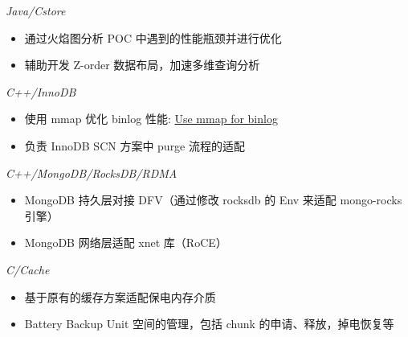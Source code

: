 \documentclass{resume}
\begin{document}
\textit{Java/Cstore}
\begin{onehalfspacing}
\begin{itemize}
  \item 通过火焰图分析 POC 中遇到的性能瓶颈并进行优化
  \item 辅助开发 Z-order 数据布局，加速多维查询分析
\end{itemize}
\end{onehalfspacing}

\textit{C++/InnoDB}
\begin{onehalfspacing}
\begin{itemize}
  \item 使用 mmap 优化 binlog 性能: \href{https://github.com/mysql/mysql-server/pull/314}{Use mmap for binlog}
  \item 负责 InnoDB SCN 方案中 purge 流程的适配
\end{itemize}
\end{onehalfspacing}

\textit{C++/MongoDB/RocksDB/RDMA}
\begin{onehalfspacing}
\begin{itemize}
  \item MongoDB 持久层对接 DFV（通过修改 rocksdb 的 Env 来适配 mongo-rocks 引擎）
  \item MongoDB 网络层适配 xnet 库（RoCE）
\end{itemize}
\end{onehalfspacing}

\textit{C/Cache}
\begin{onehalfspacing}
\begin{itemize}
  \item 基于原有的缓存方案适配保电内存介质
  \item Battery Backup Unit 空间的管理，包括 chunk 的申请、释放，掉电恢复等
\end{itemize}
\end{onehalfspacing}
\end{document}
